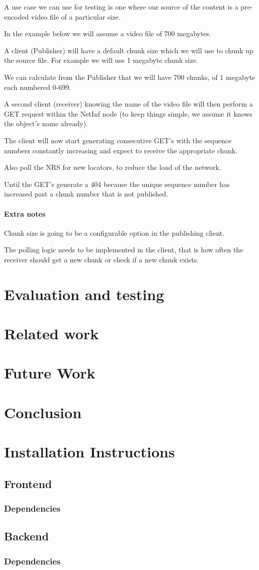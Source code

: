 \documentclass[11pt]{report}
\begin{document}
A use case we can use for testing is one where our source of the content is a pre-encoded video file of a particular size.

In the example below we will assume a video file of 700 megabytes.

A client (Publisher) will have a default chunk size which we will use to chunk up the source file. For example we will use 1 megabyte chunk size.

We can calculate from the Publisher that we will have 700 chunks, of 1 megabyte each numbered 0-699. 

A second client (receiver) knowing the name of the video file will then perform a GET request within the NetInf node (to keep things simple, we assume it knows the object's name already).

The client will now start generating consecutive GET's with the sequence numbers constantly increasing and expect to receive the appropriate chunk.

Also poll the NRS for new locators, to reduce the load of the network.

Until the GET's generate a 404 because the unique sequence number has increased past a chunk number that is not published.

\subsubsection{Extra notes}

Chunk size is going to be a configurable option in the publishing client.

The polling logic needs to be implemented in the client, that is how often the receiver should get a new chunk or check if a new chunk exists.  

\chapter{Evaluation and testing}
\chapter{Related work}
\chapter{Future Work}
\chapter{Conclusion}
\chapter{Installation Instructions}
\section {Frontend}
\subsection {Dependencies}
\section {Backend}
\subsection {Dependencies}
\end{document}
